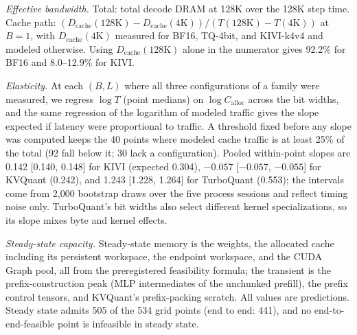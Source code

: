 \textit{Effective bandwidth.}
Total: total decode DRAM at 128K over the 128K step time.
Cache path: $(D_{\mathrm{cache}}(128\mathrm{K}) - D_{\mathrm{cache}}(4\mathrm{K})) / (T(128\mathrm{K}) - T(4\mathrm{K}))$ at $B = 1$, with $D_{\mathrm{cache}}(4\mathrm{K})$ measured for BF16, TQ-4bit, and KIVI-k4v4 and modeled otherwise.
Using $D_{\mathrm{cache}}(128\mathrm{K})$ alone in the numerator gives 92.2\% for BF16 and 8.0--12.9\% for KIVI.

\textit{Elasticity.}
At each $(B, L)$ where all three configurations of a family were measured, we regress $\log T$ (point medians) on $\log C_{\mathrm{alloc}}$ across the bit widths, and the same regression of the logarithm of modeled traffic gives the slope expected if latency were proportional to traffic.
A threshold fixed before any slope was computed keeps the 40 points where modeled cache traffic is at least 25\% of the total (92 fall below it; 30 lack a configuration).
Pooled within-point slopes are 0.142 [0.140, 0.148] for KIVI (expected 0.304), $-0.057$ [$-0.057$, $-0.055$] for KVQuant (0.242), and 1.243 [1.228, 1.264] for TurboQuant\ported{} (0.553); the intervals come from 2,000 bootstrap draws over the five process sessions and reflect timing noise only.
TurboQuant's bit widths also select different kernel specializations, so its slope mixes byte and kernel effects.

\textit{Steady-state capacity.}
Steady-state memory is the weights, the allocated cache including its persistent workspace, the endpoint workspace, and the CUDA Graph pool, all from the preregistered feasibility formula; the transient is the prefix-construction peak (MLP intermediates of the unchunked prefill), the prefix control tensors, and KVQuant's prefix-packing scratch.
All values are predictions.
Steady state admits 505 of the 534 grid points (end to end: 441), and no end-to-end-feasible point is infeasible in steady state.

